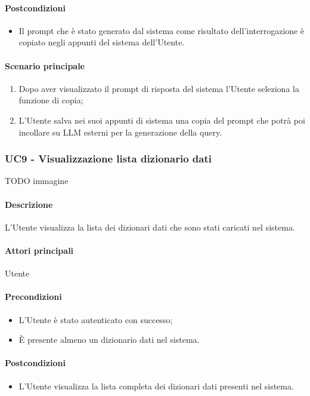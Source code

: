 \paragraph*{Postcondizioni}
\begin{itemize}
  \item Il prompt che è stato generato dal sistema come risultato dell’interrogazione è copiato negli appunti del sistema dell’Utente.
\end{itemize}

\paragraph*{Scenario principale}
\begin{enumerate}
  \item Dopo aver visualizzato il prompt di risposta del sistema l’Utente seleziona la funzione di copia;
  \item L’Utente salva nei suoi appunti di sistema una copia del prompt che potrà poi incollare su LLM esterni per la generazione della query.
\end{enumerate}


\subsubsection{UC9 - Visualizzazione lista dizionario dati}\label{UC9}
TODO immagine\paragraph*{Descrizione}
L’Utente visualizza la lista dei dizionari dati che sono stati caricati nel sistema.

\paragraph*{Attori principali} Utente

\paragraph*{Precondizioni}
\begin{itemize}
  \item L’Utente è stato autenticato con successo;
  \item È presente almeno un dizionario dati nel sistema.  
\end{itemize}

\paragraph*{Postcondizioni}
\begin{itemize}
  \item L’Utente visualizza la lista completa dei dizionari dati presenti nel sistema.
\end{itemize}

